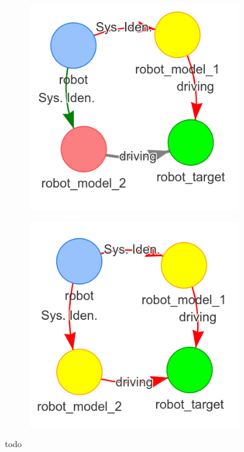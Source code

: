 \begin{figure}[H]
\begin{subfigure}{.3\textwidth}
    \caption{}
    \end{subfigure}
    \begin{subfigure}{.3\textwidth}
    \centering
    \includegraphics[width=1\textwidth]{figures/connecting_nodes/failure/fail_6}
    \caption{}
    \end{subfigure}
    \begin{subfigure}{.3\textwidth}
    \centering
    \includegraphics[width=1\textwidth]{figures/connecting_nodes/failure/fail_7}
    \caption{}
    \end{subfigure}

    \caption{todo}%
    \label{fig:failure_in_hgraph}
\end{figure}




